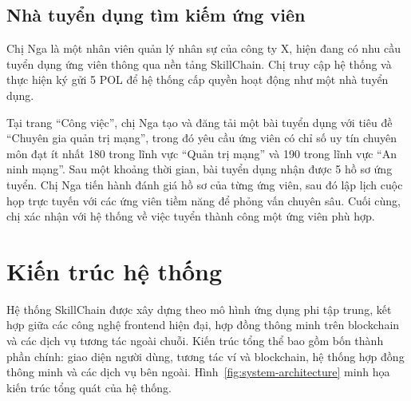 \subsection{Nhà tuyển dụng tìm kiếm ứng viên}

Chị Nga là một nhân viên quản lý nhân sự của công ty X, hiện đang có nhu cầu tuyển dụng ứng viên thông qua nền tảng SkillChain. 
Chị truy cập hệ thống và thực hiện ký gửi 5 POL để hệ thống cấp quyền hoạt động như một nhà tuyển dụng.

Tại trang ``Công việc'', chị Nga tạo và đăng tải một bài tuyển dụng với tiêu đề ``Chuyên gia quản trị mạng'', trong đó yêu cầu ứng viên có chỉ số uy tín chuyên môn đạt ít nhất 180 trong lĩnh vực ``Quản trị mạng'' và 190 trong lĩnh vực ``An ninh mạng''.
Sau một khoảng thời gian, bài tuyển dụng nhận được 5 hồ sơ ứng tuyển. Chị Nga tiến hành đánh giá hồ sơ của từng ứng viên, sau đó lập lịch cuộc họp trực tuyến với các ứng viên tiềm năng để phỏng vấn chuyên sâu. 
Cuối cùng, chị xác nhận với hệ thống về việc tuyển thành công một ứng viên phù hợp.

\section{Kiến trúc hệ thống}

Hệ thống SkillChain được xây dựng theo mô hình ứng dụng phi tập trung, kết hợp giữa các công nghệ frontend hiện đại, hợp đồng thông minh trên blockchain và các dịch vụ tương tác ngoài chuỗi.
Kiến trúc tổng thể bao gồm bốn thành phần chính: giao diện người dùng, tương tác ví và blockchain, hệ thống hợp đồng thông minh và các dịch vụ bên ngoài.
Hình~\ref{fig:system-architecture} minh họa kiến trúc tổng quát của hệ thống.

